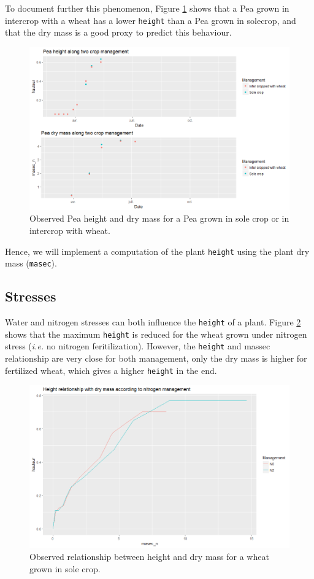 \documentclass[
]{book}
\begin{document}
To document further this phenomenon, Figure \ref{fig:Peaheight} shows that a Pea grown in intercrop with a wheat has a lower \texttt{height} than a Pea grown in solecrop, and that the dry mass is a good proxy to predict this behaviour.

\begin{figure}
\centering
\includegraphics{img/Pea_height.png}
\caption{\label{fig:Peaheight}Observed Pea height and dry mass for a Pea grown in sole crop or in intercrop with wheat.}
\end{figure}

Hence, we will implement a computation of the plant \texttt{height} using the plant dry mass (\texttt{masec}).

\hypertarget{stresses}{%
\subsection{Stresses}\label{stresses}}

Water and nitrogen stresses can both influence the \texttt{height} of a plant. Figure \ref{fig:wheatheightN} shows that the maximum \texttt{height} is reduced for the wheat grown under nitrogen stress (\emph{i.e.} no nitrogen feritilization). However, the \texttt{height} and massec relationship are very close for both management, only the dry mass is higher for fertilized wheat, which gives a higher \texttt{height} in the end.

\begin{figure}
\centering
\includegraphics{img/wheat_height_N.png}
\caption{\label{fig:wheatheightN}Observed relationship between height and dry mass for a wheat grown in sole crop.}
\end{figure}
\end{document}
